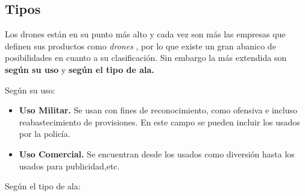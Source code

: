 \subsection{Tipos}

Los drones están en su punto más alto y cada vez son más las empresas que definen sus productos como \textit{drones} , por lo que existe un gran abanico de posibilidades en cuanto a su clasificación. \cite{TipoDron} Sin embargo la más extendida son \textbf{según su uso} y \textbf{según el tipo de ala.} \newline

Según su uso: 

\begin{itemize}
	\item \textbf{Uso Militar.} Se usan con fines de reconocimiento, como ofensiva e incluso reabastecimiento de provisiones. En este campo se pueden incluir los usados por la policía.
	\item \textbf{Uso Comercial.} Se encuentran desde los usados como diversión hasta los usados para publicidad,etc.
\end{itemize}

Según el tipo de ala:

